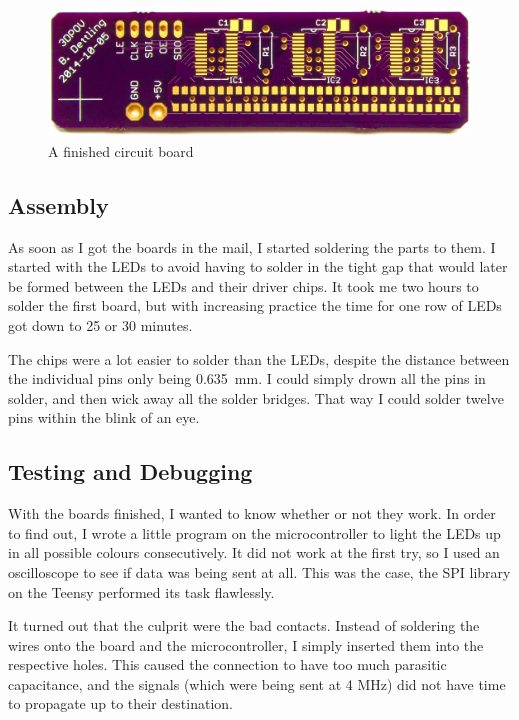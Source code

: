 \documentclass[a4paper, 11pt, titlepage]{report}
\begin{document}
\begin{figure}[h]
\vspace{3mm}
\includegraphics[width=\textwidth]{./images/board-finished.jpeg}
\vspace{-8mm}
\caption{A finished circuit board}
\end{figure}


\subsection{Assembly}

As soon as I got the boards in the mail, I started soldering the parts to them. I started with the
LEDs to avoid having to solder in the tight gap that would later be formed between the LEDs and
their driver chips. It took me two hours to solder the first board, but with increasing practice
the time for one row of LEDs got down to 25 or 30 minutes.

The chips were a lot easier to solder than the LEDs, despite the distance between the individual
pins only being \SI{0.635}{\milli\meter}. I could simply drown all the pins in solder, and then
wick away all the solder bridges. That way I could solder twelve pins within the blink of an eye.





\subsection {Testing and Debugging}

With the boards finished, I wanted to know whether or not they work. In order to find out, I wrote
a little program on the microcontroller to light the LEDs up in all possible colours
consecutively.  It did not work at the first try, so I used an oscilloscope to see if data was
being sent at all.  This was the case, the SPI library on the Teensy performed its task
flawlessly.

It turned out that the culprit were the bad contacts. Instead of soldering the wires onto the
board and the microcontroller, I simply inserted them into the respective holes. This caused the
connection to have too much parasitic capacitance, and the signals (which were being sent at 4
MHz) did not have time to propagate up to their destination.
\end{document}
